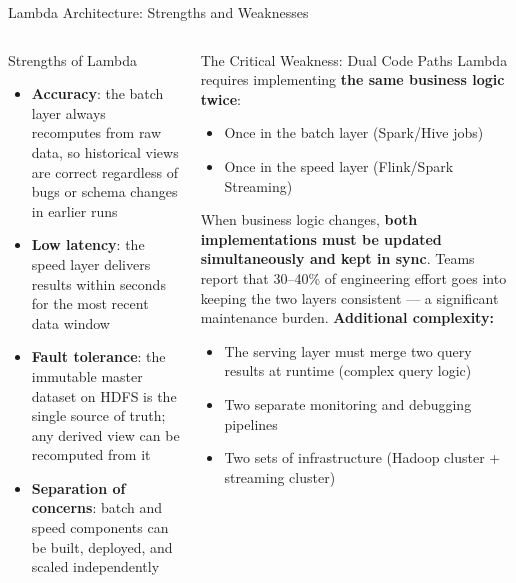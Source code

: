 \documentclass[aspectratio=169,10pt]{beamer}
\begin{document}
\begin{frame}{Lambda Architecture: Strengths and Weaknesses}
  \begin{columns}[T]
      \begin{exampleblock}{Strengths of Lambda}
        \begin{itemize}
          \item \textbf{Accuracy}: the batch layer always recomputes from raw data, so historical views are correct regardless of bugs or schema changes in earlier runs
          \item \textbf{Low latency}: the speed layer delivers results within seconds for the most recent data window
          \item \textbf{Fault tolerance}: the immutable master dataset on HDFS is the single source of truth; any derived view can be recomputed from it
          \item \textbf{Separation of concerns}: batch and speed components can be built, deployed, and scaled independently
        \end{itemize}
      \end{exampleblock}

      \begin{alertblock}{The Critical Weakness: Dual Code Paths}
        Lambda requires implementing \textbf{the same business logic twice}:
        \begin{itemize}
          \item Once in the batch layer (Spark/Hive jobs)
          \item Once in the speed layer (Flink/Spark Streaming)
        \end{itemize}
        \vspace{4pt}
        When business logic changes, \textbf{both implementations must be updated simultaneously and kept in sync}.  Teams report that 30--40\% of engineering effort goes into keeping the two layers consistent --- a significant maintenance burden.
        \vspace{4pt}
        \textbf{Additional complexity:}
        \begin{itemize}
          \item The serving layer must merge two query results at runtime (complex query logic)
          \item Two separate monitoring and debugging pipelines
          \item Two sets of infrastructure (Hadoop cluster + streaming cluster)
        \end{itemize}
      \end{alertblock}
  \end{columns}
\end{frame}
\end{document}
